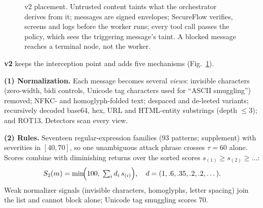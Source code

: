 \documentclass[conference]{IEEEtran}
\begin{document}
\begin{figure}[!t]
\centering
{}
\caption{v2 placement. Untrusted content taints what the orchestrator derives from
it; messages are signed envelopes; SecureFlow verifies, screens and logs before the
worker runs; every tool call passes the policy, which sees the triggering message's
taint. A blocked message reaches a terminal node, not the worker.}
\label{fig:arch}
\end{figure}

\textbf{v2} keeps the interception point and adds five mechanisms (Fig.~\ref{fig:arch}).

\textbf{(1) Normalization.} Each message becomes several \emph{views}: invisible
characters (zero-width, bidi controls, Unicode tag characters used for ``ASCII
smuggling'') removed; NFKC- and homoglyph-folded text; despaced and de-leeted
variants; recursively decoded base64, hex, URL and HTML-entity substrings (depth
$\le3$); and ROT13. Detectors scan every view.

\textbf{(2) Rules.} Seventeen regular-expression families (93 patterns; supplement)
with severities in $[40,70]$, so one unambiguous attack phrase crosses $\tau=60$ alone.
Scores combine with diminishing returns over the sorted scores $s_{(1)}\ge s_{(2)}\ge\dots$:
\begin{equation}
  S_{2}(m) = \min\!\Bigl(100,\; \textstyle\sum_{i} d_i\, s_{(i)}\Bigr),\quad
  d=(1,.6,.35,.2,.2,\dots).
  \label{eq:score2}
\end{equation}
Weak normalizer signals (invisible characters, homoglyphs, letter spacing) join the
list and cannot block alone; Unicode tag smuggling scores 70.
\end{document}

